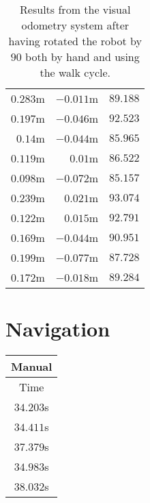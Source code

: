 \begin{appendices}
\begin{table}[!h]
\begin{tabular}{ r r r }
		$0.283$m &
		$-0.011$m &
		$89.188$\textdegree{} \\

		$0.197$m &
		$-0.046$m &
		$92.523$\textdegree{} \\

		$0.14$m &
		$-0.044$m &
		$85.965$\textdegree{} \\

		$0.119$m &
		$0.01$m &
		$86.522$\textdegree{} \\

		$0.098$m &
		$-0.072$m &
		$85.157$\textdegree{} \\

		$0.239$m &
		$0.021$m &
		$93.074$\textdegree{} \\

		$0.122$m &
		$0.015$m &
		$92.791$\textdegree{} \\

		$0.169$m &
		$-0.044$m &
		$90.951$\textdegree{} \\

		$0.199$m &
		$-0.077$m &
		$87.728$\textdegree{} \\

		\midrule
		$0.172$m &
		$-0.018$m &
		$89.284$\textdegree{} \\
		\bottomrule
	\end{tabular}

	\caption{Results from the visual odometry system after having rotated the robot by $90$\textdegree{} both by hand and using the walk cycle.}
	\label{tab:eval_vo_rot}
\end{table}

\section{Navigation}


\begin{table}[!h]
	\centering
	\begin{tabular}{ c }
		\toprule
		\textbf{Manual} \\
		\midrule
		Time \\
		\midrule
		$34.203$s \\

		$34.411$s \\

		$37.379$s \\

		$34.983$s \\

		$38.032$s \\


\end{tabular}
\end{table}
\end{appendices}
